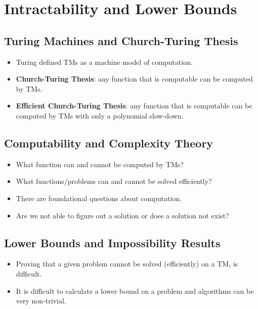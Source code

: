 
\section{Intractability and Lower Bounds}

\subsection{Turing Machines and Church-Turing Thesis}
\begin{itemize}
    \item Turing defined TMs as a machine model of computation.
    \item \textbf{Church-Turing Thesis}: any function that is computable can be computed by TMs.
    \item \textbf{Efficient Church-Turing Thesis}: any function that is computable can be computed by TMs with only a polynomial slow-down.
\end{itemize}

\subsection{Computability and Complexity Theory}
\begin{itemize}
    \item What function can and cannot be computed by TMs?
    \item What functions/problems can and cannot be solved efficiently?
    \item There are foundational questions about computation.
    \item Are we not able to figure out a solution or does a solution not exist?
\end{itemize}

\subsection{Lower Bounds and Impossibility Results}
\begin{itemize}
    \item Proving that a given problem cannot be solved (efficiently) on a TM, is difficult. 
    \item It is difficult to calculate a lower bound on a problem and algorithms can be very non-trivial.
\end{itemize}

